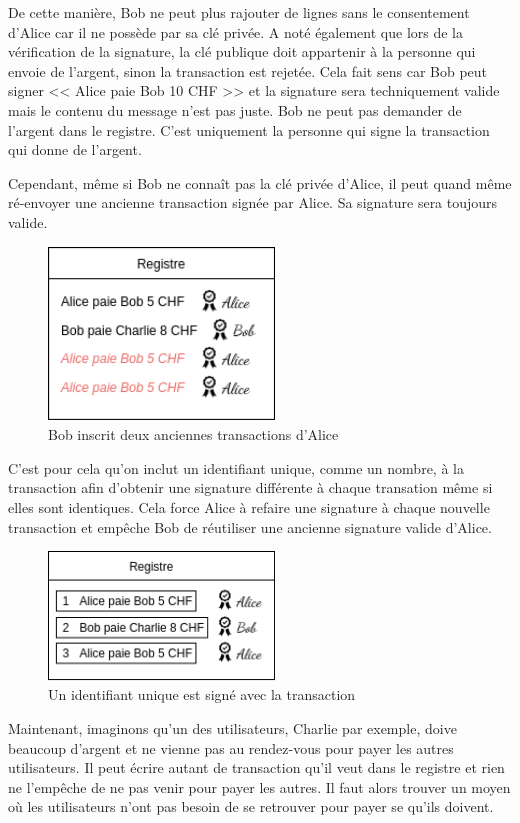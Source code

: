 De cette manière, Bob ne peut plus rajouter de lignes sans le consentement d'Alice car il ne possède par sa clé privée. A noté également que lors de la vérification de la signature, la clé publique doit appartenir à la personne qui envoie de l'argent, sinon la transaction est rejetée. Cela fait sens car Bob peut signer << Alice paie Bob 10 CHF >> et la signature sera techniquement valide mais le contenu du message n'est pas juste. Bob ne peut pas demander de l'argent dans le registre. C'est uniquement la personne qui signe la transaction qui donne de l'argent. 

Cependant, même si Bob ne connaît pas la clé privée d'Alice, il peut quand même ré-envoyer une ancienne transaction signée par Alice. Sa signature sera toujours valide.

\begin{figure}[H]
  \centering
  \includegraphics[width=6cm]{images/crypto_4.png}
  \caption{Bob inscrit deux anciennes transactions d'Alice}
\end{figure}

C'est pour cela qu'on inclut un identifiant unique, comme un nombre, à la transaction afin d'obtenir une signature différente à chaque transation même si elles sont identiques. Cela force Alice à refaire une signature à chaque nouvelle transaction et empêche Bob de réutiliser une ancienne signature valide d'Alice.

\begin{figure}[H]
  \centering
  \includegraphics[width=6cm]{images/crypto_5.png}
  \caption{Un identifiant unique est signé avec la transaction}
\end{figure}

Maintenant, imaginons qu'un des utilisateurs, Charlie par exemple, doive beaucoup d'argent et ne vienne pas au rendez-vous pour payer les autres utilisateurs. Il peut écrire autant de transaction qu'il veut dans le registre et rien ne l'empêche de ne pas venir pour payer les autres. Il faut alors trouver un moyen où les utilisateurs n'ont pas besoin de se retrouver pour payer se qu'ils doivent.

